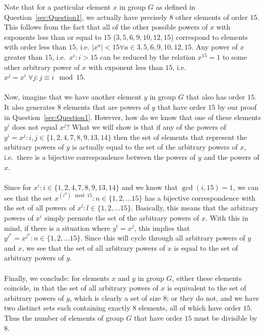 \documentclass[letterpaper]{article}
\begin{document}
Note that for a particular element $ x $ in group $ G $ as defined in Question~\ref{sec:Question1}, we actually have precisely $ 8 $ other elements of order $ 15 $.
This follows from the fact that all of the other possible powers of $ x $ with exponents less than or equal to $ 15 $ ($ 3, 5, 6, 9, 10, 12, 15 $) correspond to elements with order less than $ 15 $, i.e. $ |x^a| < 15 \forall a \in {3, 5, 6, 9, 10, 12, 15} $.
Any power of $ x $ greater than $ 15 $, i.e.\ $ x^i : i > 15 $ can be reduced by the relation $ x^{15} = 1 $ to some other arbitrary power of $ x $ with exponent less than $ 15 $, i.e.\ $ x^j = x^i \; \forall j : j \equiv i \mod{15} $.
\\ \\
Now, imagine that we have another element $ y $ in group $ G $ that also has order $ 15 $.
It also generates $ 8 $ elements that are powers of $ y $ that have order $ 15 $ by our proof in Question~\ref{sec:Question1}.
However, how do we know that one of these elements $ y^i $ does not equal $ x^j $?
What we will show is that if any of the powers of $ y^i = x^j : i, j \in \{1, 2, 4, 7, 8, 9, 13, 14\} $ then the set of elements that represent the arbitrary powers of $ y $ is actually equal to the set of the arbitrary powers of $ x $, i.e.\ there is a bijective correspondence between the powers of $ y $ and the powers of $ x $.
\\ \\
Since for $ x^i : i \in \{1, 2, 4, 7, 8, 9, 13, 14\} $ and we know that $ \gcd(i, 15) = 1 $, we can see that the set $ x^{(i^n) \mod{15}} : n \in \{1, 2, \ldots 15 \} $ has a bijective correspondence with the set of all powers of $ x^l : l \in \{1, 2, \ldots 15 \} $.
Basically, this means that the arbitrary powers of $ x^i $ simply permute the set of the arbitrary powers of $ x $.
With this in mind, if there is a situation where $ y^i = x^j $, this implies that $ y^{i^n} = x^{j^n} : n \in \{1, 2, \ldots 15 \} $.
Since this will cycle through all arbitrary powers of $ y $ and $ x $, we see that the set of all arbitrary powers of $ x $ is equal to the set of arbitrary powers of $ y $.
\\ \\
Finally, we conclude: for elements $ x $ and $ y $ in group $ G $, either these elements coincide, in that the set of all arbitrary powers of $ x $ is equivalent to the set of arbitrary powers of $ y $, which is clearly a set of size $ 8 $; or they do not, and we have two distinct sets each containing exactly $ 8 $ elements, all of which have order $ 15 $.
Thus the number of elements of group $ G $ that have order $ 15 $ must be divisible by $ 8 $.
\end{document}
